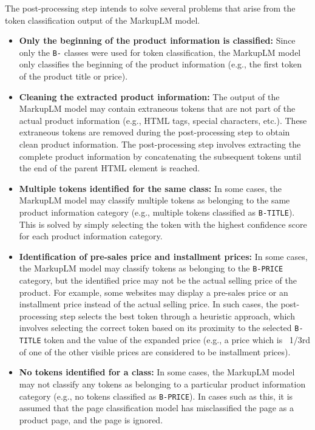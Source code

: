 The post-processing step intends to solve several problems that arise from the token classification output of the MarkupLM model.
\begin{itemize}
    \item \textbf{Only the beginning of the product information is classified:} Since only the \texttt{B-} classes were used for token classification, the MarkupLM model only classifies the beginning of the product information (e.g., the first token of the product title or price).
    \item \textbf{Cleaning the extracted product information:} The output of the MarkupLM model may contain extraneous tokens that are not part of the actual product information (e.g., HTML tags, special characters, etc.).  These extraneous tokens are removed during the post-processing step to obtain clean product information.
    The post-processing step involves extracting the complete product information by concatenating the subsequent tokens until the end of the parent HTML element is reached.
    \item \textbf{Multiple tokens identified for the same class:} In some cases, the MarkupLM model may classify multiple tokens as belonging to the same product information category (e.g., multiple tokens classified as \texttt{B-TITLE}). This is solved by simply selecting the token with the highest confidence score for each product information category.
    \item \textbf{Identification of pre-sales price and installment prices:} In some cases, the MarkupLM model may classify tokens as belonging to the \texttt{B-PRICE} category, but the identified price may not be the actual selling price of the product.
    For example, some websites may display a pre-sales price or an installment price instead of the actual selling price.
    In such cases, the post-processing step selects the best token through a heuristic approach, which involves selecting the correct token based on its proximity to the selected \texttt{B-TITLE} token and the value of the expanded price (e.g., a price which is ~1/3rd of one of the other visible prices are considered to be installment prices).
    \item \textbf{No tokens identified for a class:} In some cases, the MarkupLM model may not classify any tokens as belonging to a particular product information category (e.g., no tokens classified as \texttt{B-PRICE}).  In cases such as this, it is assumed that the page classification model has misclassified the page as a product page, and the page is ignored.
\end{itemize}

